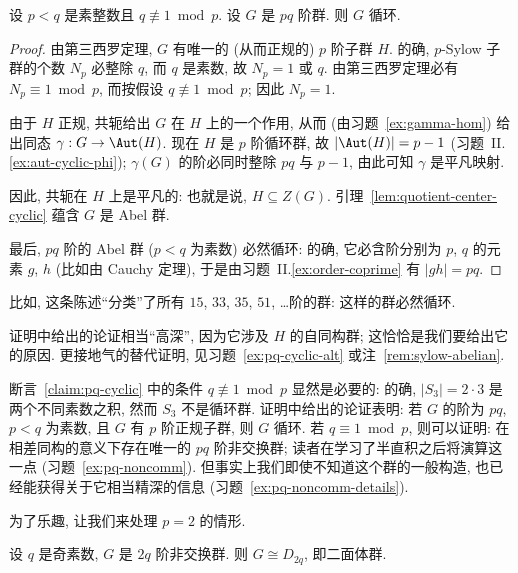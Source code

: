 \begin{claim}
\label{claim:pq-cyclic}
设 $p < q$ 是素整数且 $q \not\equiv 1 \bmod p$. 设 $G$ 是 $pq$ 阶群. 则 $G$ 循环.
\end{claim}

\begin{proof}
由第三西罗定理, $G$ 有唯一的 (从而正规的) $p$ 阶子群 $H$. 的确, $p$-Sylow 子群的个数 $N_p$ 必整除 $q$, 而 $q$ 是素数, 故 $N_p = 1$ 或 $q$. 由第三西罗定理必有 $N_p \equiv 1 \bmod p$, 而按假设 $q \not\equiv 1 \bmod p$; 因此 $N_p = 1$.

由于 $H$ 正规, 共轭给出 $G$ 在 $H$ 上的一个作用, 从而 (由习题~\ref{ex:gamma-hom}) 给出同态 $\gamma : G \to \Aut(H)$. 现在 $H$ 是 $p$ 阶循环群, 故 $|\Aut(H)| = p - 1$ (习题~II.\ref{ex:aut-cyclic-phi}); $\gamma(G)$ 的阶必同时整除 $pq$ 与 $p-1$, 由此可知 $\gamma$ 是平凡映射.

因此, 共轭在 $H$ 上是平凡的: 也就是说, $H \subseteq Z(G)$. 引理~\ref{lem:quotient-center-cyclic} 蕴含 $G$ 是 Abel 群.

最后, $pq$ 阶的 Abel 群 ($p < q$ 为素数) 必然循环: 的确, 它必含阶分别为 $p$, $q$ 的元素 $g$, $h$ (比如由 Cauchy 定理), 于是由习题~II.\ref{ex:order-coprime} 有 $|gh| = pq$.
\end{proof}

比如, 这条陈述``分类''了所有 $15$, $33$, $35$, $51$, \ldots 阶的群: 这样的群必然循环.

证明中给出的论证相当``高深'', 因为它涉及 $H$ 的自同构群; 这恰恰是我们要给出它的原因. 更接地气的替代证明, 见习题~\ref{ex:pq-cyclic-alt} 或注~\ref{rem:sylow-abelian}.

断言~\ref{claim:pq-cyclic} 中的条件 $q \not\equiv 1 \bmod p$ 显然是必要的: 的确, $|S_3| = 2 \cdot 3$ 是两个不同素数之积, 然而 $S_3$ 不是循环群. 证明中给出的论证表明: 若 $G$ 的阶为 $pq$, $p < q$ 为素数, 且 $G$ 有 $p$ 阶正规子群, 则 $G$ 循环. 若 $q \equiv 1 \bmod p$, 则可以证明: 在相差同构的意义下存在唯一的 $pq$ 阶非交换群; 读者在学习了半直积之后将演算这一点 (习题~\ref{ex:pq-noncomm}). 但事实上我们即使不知道这个群的一般构造, 也已经能获得关于它相当精深的信息 (习题~\ref{ex:pq-noncomm-details}).

为了乐趣, 让我们来处理 $p = 2$ 的情形.

\begin{claim}
\label{claim:2q-dihedral}
设 $q$ 是奇素数, $G$ 是 $2q$ 阶非交换群. 则 $G \cong D_{2q}$, 即二面体群.
\end{claim}


